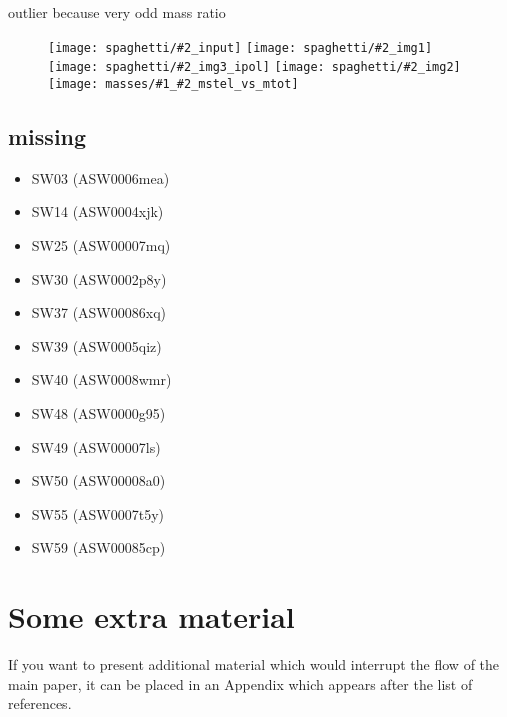 \documentclass[fleqn,usenatbib]{mnras}
\newcommand{\inclfig}[2]{
  \centering
  \texttt{[image: spaghetti/\#2\_input]} %
  \texttt{[image: spaghetti/\#2\_img1]} \\
  \texttt{[image: spaghetti/\#2\_img3\_ipol]} %
  \texttt{[image: spaghetti/\#2\_img2]} \\
  \texttt{[image: masses/\#1\_\#2\_mstel\_vs\_mtot]}
}
\begin{document}
outlier because very odd mass ratio
\begin{figure}
	\inclfig{SW42}{ASW00096rm_4Q3YCEWGLN}
\end{figure}







\subsection{missing}
\begin{itemize}
  \item SW03 (ASW0006mea)
  \item SW14 (ASW0004xjk)
  \item SW25 (ASW00007mq)
  \item SW30 (ASW0002p8y)
  \item SW37 (ASW00086xq)
  \item SW39 (ASW0005qiz)
  \item SW40 (ASW0008wmr)
  \item SW48 (ASW0000g95)
  \item SW49 (ASW00007ls)
  \item SW50 (ASW00008a0)
  \item SW55 (ASW0007t5y)
  \item SW59 (ASW00085cp)
\end{itemize}










\appendix

\section{Some extra material}

If you want to present additional material which would interrupt the flow of the main paper,
it can be placed in an Appendix which appears after the list of references.




\bsp	%
\label{lastpage}
\end{document}
